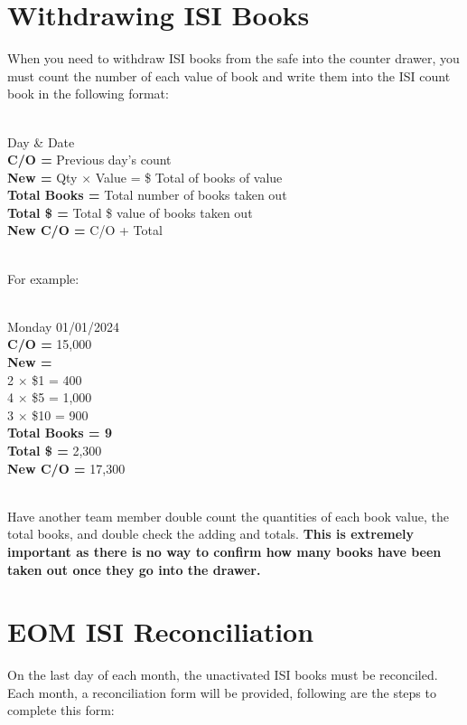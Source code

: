 \documentclass[a4paper, 12pt]{article}
\begin{document}
\newpage
\section{Withdrawing ISI Books}
When you need to withdraw ISI books from the safe into the counter drawer, you must count the number of each value of book and write them into the ISI count book in the following format:
\\ \\
\hspace*{1cm}%
\begin{minipage}{.8\textwidth}%
   Day \& Date \\
   \textbf{C/O =} Previous day's count \\
   \textbf{New =} Qty $\times$ Value = \$ Total of books of value \\
   \textbf{Total Books = } Total number of books taken out \\
   \textbf{Total \$ =} Total \$ value of books taken out \\
   \textbf{New C/O =} C/O + Total \\
\end{minipage}%
\\
For example:
\\ \\
\hspace*{1cm}
\begin{minipage}{.8\textwidth}
   Monday 01/01/2024 \\
   \textbf{C/O =} 15,000 \\
   \textbf{New =} \\
   2 $\times$ \$1 = 400 \\
   4 $\times$ \$5 = 1,000 \\
   3 $\times$ \$10 = 900 \\
   \textbf{Total Books = 9} \\
   \textbf{Total \$ =} 2,300 \\
   \textbf{New C/O =} 17,300 \\
\end{minipage}
\\
Have another team member double count the quantities of each book value, the total books, and double check the adding and totals. 
\color{red} \textbf{This is extremely important as there is no way to confirm how many books have been taken out once they go into the drawer.} \color{black}


\newpage
\section{EOM ISI Reconciliation}
On the last day of each month, the unactivated ISI books must be reconciled. Each month, a reconciliation form will be provided, following are the steps to complete this form:
\end{document}
